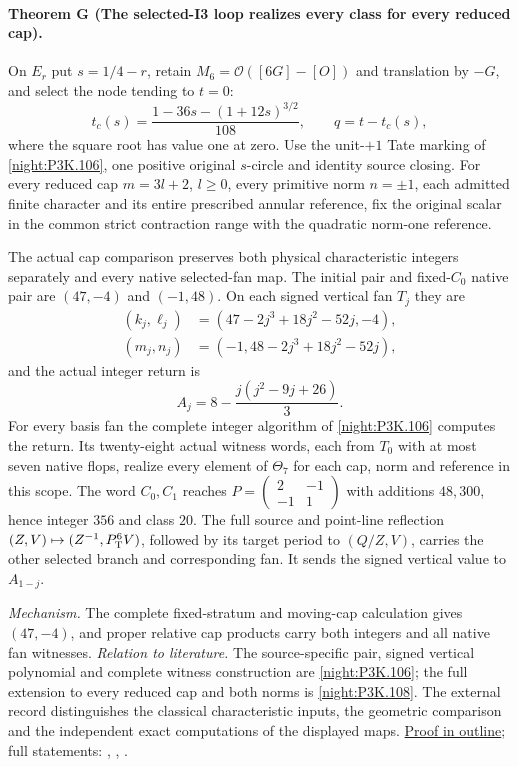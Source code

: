 \hypertarget{main-IV-G}{}
\paragraph{Theorem G (The selected-I3 loop realizes every class for every reduced cap).}
\label{series:IV:G}
On $E_r$ put $s=1/4-r$, retain $M_6=\mathcal O([6G]-[O])$
and translation by $-G$, and select the node tending to $t=0$:
\[
 t_c(s)=\frac{1-36s-(1+12s)^{3/2}}{108},\qquad q=t-t_c(s),
\]
where the square root has value one at zero. Use the unit-$+1$
Tate marking of \cref{night:P3K.106}, one positive original
$s$-circle and identity source closing. For every reduced cap
$m=3l+2$, $l\ge0$, every primitive norm $n=\pm1$, each admitted
finite character and its entire prescribed annular reference, fix
the original scalar in the common strict contraction range with
the quadratic norm-one reference.

The actual cap comparison preserves both physical characteristic
integers separately and every native selected-fan map. The initial
pair and fixed-$C_0$ native pair are $(47,-4)$ and $(-1,48)$.
On each signed vertical fan $T_j$ they are
\[
\begin{aligned}
 (k_j,\ell_j)&=(47-2j^3+18j^2-52j,-4),\\
 (m_j,n_j)&=(-1,48-2j^3+18j^2-52j),
\end{aligned}
\]
and the actual integer return is
\[
 A_j=8-\frac{j(j^2-9j+26)}3.
\]
For every basis fan the complete integer algorithm of
\cref{night:P3K.106} computes the return. Its twenty-eight actual
witness words, each from $T_0$ with at most seven native flops,
realize every element of $\Theta_7$ for each cap, norm and
reference in this scope. The word $C_0,C_1$ reaches
$P=\left(\begin{smallmatrix}2&-1\\-1&1\end{smallmatrix}\right)$
with additions $48,300$, hence integer $356$ and class $20$.
The full source and point-line reflection
$(Z,V)\mapsto(Z^{-1},P_{\rm T}^6V)$, followed by its target period
to $(Q/Z,V)$, carries the other selected branch and corresponding
fan. It sends the signed vertical value to $A_{1-j}$.

\textit{Mechanism.} The complete fixed-stratum and moving-cap calculation gives
$(47,-4)$, and proper relative cap products carry both integers and all native fan witnesses.
\textit{Relation to literature.} The source-specific pair, signed vertical polynomial and
complete witness construction are \cref{night:P3K.106}; the full
extension to every reduced cap and both norms is
\cref{night:P3K.108}. The external record distinguishes the
classical characteristic inputs, the geometric comparison and
the independent exact computations of the displayed maps.
\hyperlink{outline-IV-G}{Proof in outline}; full statements: , , .

